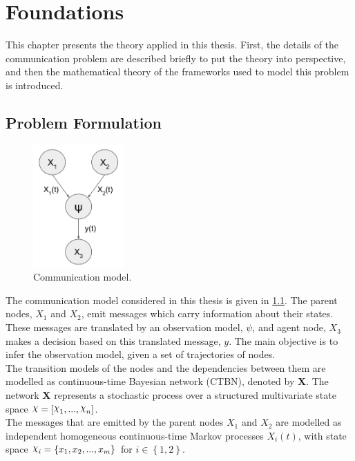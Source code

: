 \chapter{Foundations}
\label{chap:2}

This chapter presents the theory applied in this thesis. First, the details of the communication problem are described briefly to put the theory into perspective, and then the mathematical theory of the frameworks used to model this problem is introduced. 

\section{Problem Formulation}
\label{sec:prob_formulation}

\begin{figure}
	\begin{center}
		\includegraphics[width=3.5cm]{figures/simple_graph}
		\caption{Communication model.}
		\label{fig:graph_model}
	\end{center}
\end{figure} 
The communication model considered in this thesis is given in \cref{fig:graph_model}. The parent nodes, $X_{1}$ and $ X_{2}$, emit messages which carry information about their states. These messages are translated by an observation model, $\psi$, and agent node, $ X_{3} $ makes a decision based on this translated message, $ y $. The main objective is to infer the observation model, given a set of trajectories of nodes.\\
The transition models of the nodes and the dependencies between them are modelled as continuous-time Bayesian network (CTBN), denoted by \textbf{X}. The network \textbf{X} represents a stochastic process over a structured multivariate state space $ \rchi = [\rchi_1,..., \rchi_n] $. \\
The messages that are emitted by the parent nodes $X_{1}$ and $ X_{2} $ are modelled as independent homogeneous continuous-time Markov processes $X_{i}(t)$, with state space $ \rchi_{i} = \left\lbrace x_{1}, x_{2}, ..., x_{m} \right\rbrace  $ for $ i \in \left\lbrace 1,2 \right\rbrace $.\\
